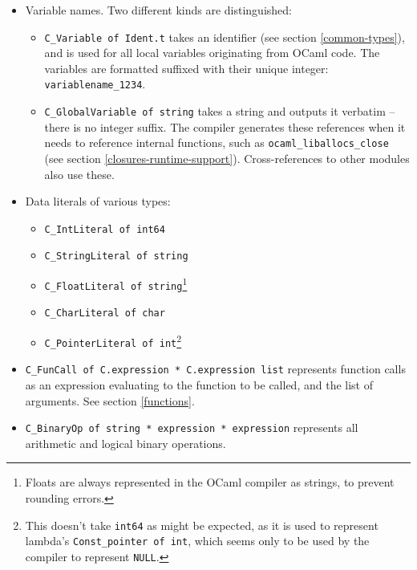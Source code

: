 \documentclass[12pt,a4paper,twoside,openright]{report}
\begin{document}
\begin{itemize}
    \begin{itemize}
        \item Variable names. Two different kinds are distinguished:
          \begin{itemize}
            \item \lstinline!C_Variable of Ident.t! takes an identifier (see section
              \ref{common-types}), and is used for all local variables
              originating from OCaml code. The variables are formatted suffixed
              with their unique integer: \lstinline!variablename_1234!.
            \item \lstinline!C_GlobalVariable of string! takes a string and
              outputs it verbatim -- there is no integer suffix. The compiler
              generates these references when it needs to reference internal
              functions, such as \lstinline!ocaml_liballocs_close! (see section
              \ref{closures-runtime-support}). Cross-references to other
              modules also use these.
          \end{itemize}
        \item Data literals of various types:
            \begin{itemize}
                \item \lstinline!C_IntLiteral of int64!
                \item \lstinline!C_StringLiteral of string!
                \item \lstinline!C_FloatLiteral of string!\footnote{Floats are
                    always represented in the OCaml compiler as strings, to
                    prevent rounding errors.}
                \item \lstinline!C_CharLiteral of char!
                \item \lstinline!C_PointerLiteral of int!\footnote{This
                    doesn't take \lstinline!int64! as might be expected, as it
                    is used to represent lambda's \lstinline!Const_pointer of int!,
                    which seems only to be used by the compiler to represent
                    \lstinline!NULL!.}
            \end{itemize}
        \item \lstinline!C_FunCall of C.expression * C.expression list!
            represents function calls as an expression evaluating to the
            function to be called, and the list of arguments. See section \ref{functions}.
        \item \lstinline!C_BinaryOp of string * expression * expression!
            represents all arithmetic and logical binary operations.
    \end{itemize}


\end{itemize}
\end{document}
